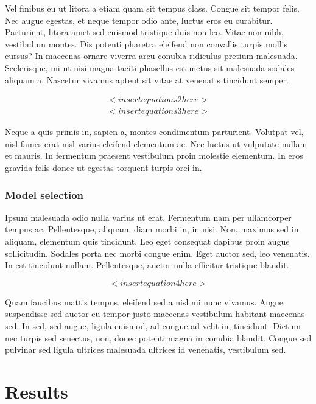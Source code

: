 \documentclass[
  11pt,
]{report}
\begin{document}
Vel finibus eu ut litora a etiam quam sit tempus class. Congue sit
tempor felis. Nec augue egestas, et neque tempor odio ante, luctus eros
eu curabitur. Parturient, litora amet sed euismod tristique duis non
leo. Vitae non nibh, vestibulum montes. Dis potenti pharetra eleifend
non convallis turpis mollis cursus? In maecenas ornare viverra arcu
conubia ridiculus pretium malesuada. Scelerisque, mi ut nisi magna
taciti phasellus est metus sit malesuada sodales aliquam a. Nascetur
vivamus aptent sit vitae at venenatis tincidunt semper.

\begin{gather}
  <insert equations 2 here> \\
  <insert equations 3 here> 
\end{gather}

Neque a quis primis in, sapien a, montes condimentum parturient.
Volutpat vel, nisl fames erat nisl varius eleifend elementum ac. Nec
luctus ut vulputate nullam et mauris. In fermentum praesent vestibulum
proin molestie elementum. In eros gravida felis donec ut egestas
torquent turpis orci in.

\hypertarget{model-selection}{%
\subsection{Model selection}\label{model-selection}}

Ipsum malesuada odio nulla varius ut erat. Fermentum nam per ullamcorper
tempus ac. Pellentesque, aliquam, diam morbi in, in nisi. Non, maximus
sed in aliquam, elementum quis tincidunt. Leo eget consequat dapibus
proin augue sollicitudin. Sodales porta nec morbi congue enim. Eget
auctor sed, leo venenatis. In est tincidunt nullam. Pellentesque, auctor
nulla efficitur tristique blandit.

\begin{equation}
  <insert equation 4 here>
\end{equation}

Quam faucibus mattis tempus, eleifend sed a nisl mi nunc vivamus. Augue
suspendisse sed auctor eu tempor justo maecenas vestibulum habitant
maecenas sed. In sed, sed augue, ligula euismod, ad congue ad velit in,
tincidunt. Dictum nec turpis sed senectus, non, donec potenti magna in
conubia blandit. Congue sed pulvinar sed ligula ultrices malesuada
ultrices id venenatis, vestibulum sed.

\hypertarget{results}{%
\chapter{Results}\label{results}}
\end{document}

